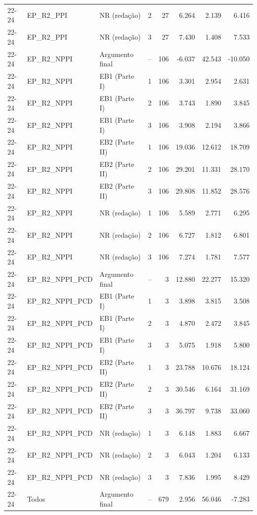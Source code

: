 \begin{longtable}{lllcrrrr}
22-24 & EP\_R2\_PPI & NR (redação) & 2 & 27 & 6.264 & 2.139 & 6.416 \\
22-24 & EP\_R2\_PPI & NR (redação) & 3 & 27 & 7.430 & 1.408 & 7.533 \\
22-24 & EP\_R2\_NPPI & Argumento final & -- & 106 & -6.037 & 42.543 & -10.050 \\
22-24 & EP\_R2\_NPPI & EB1 (Parte I) & 1 & 106 & 3.301 & 2.954 & 2.631 \\
22-24 & EP\_R2\_NPPI & EB1 (Parte I) & 2 & 106 & 3.743 & 1.890 & 3.845 \\
22-24 & EP\_R2\_NPPI & EB1 (Parte I) & 3 & 106 & 3.908 & 2.194 & 3.866 \\
22-24 & EP\_R2\_NPPI & EB2 (Parte II) & 1 & 106 & 19.036 & 12.612 & 18.709 \\
22-24 & EP\_R2\_NPPI & EB2 (Parte II) & 2 & 106 & 29.201 & 11.331 & 28.170 \\
22-24 & EP\_R2\_NPPI & EB2 (Parte II) & 3 & 106 & 29.808 & 11.852 & 28.576 \\
22-24 & EP\_R2\_NPPI & NR (redação) & 1 & 106 & 5.589 & 2.771 & 6.295 \\
22-24 & EP\_R2\_NPPI & NR (redação) & 2 & 106 & 6.727 & 1.812 & 6.801 \\
22-24 & EP\_R2\_NPPI & NR (redação) & 3 & 106 & 7.274 & 1.781 & 7.577 \\
22-24 & EP\_R2\_NPPI\_PCD & Argumento final & -- & 3 & 12.880 & 22.277 & 15.320 \\
22-24 & EP\_R2\_NPPI\_PCD & EB1 (Parte I) & 1 & 3 & 3.898 & 3.815 & 3.508 \\
22-24 & EP\_R2\_NPPI\_PCD & EB1 (Parte I) & 2 & 3 & 4.870 & 2.472 & 3.845 \\
22-24 & EP\_R2\_NPPI\_PCD & EB1 (Parte I) & 3 & 3 & 5.075 & 1.918 & 5.800 \\
22-24 & EP\_R2\_NPPI\_PCD & EB2 (Parte II) & 1 & 3 & 23.788 & 10.676 & 18.124 \\
22-24 & EP\_R2\_NPPI\_PCD & EB2 (Parte II) & 2 & 3 & 30.546 & 6.164 & 31.169 \\
22-24 & EP\_R2\_NPPI\_PCD & EB2 (Parte II) & 3 & 3 & 36.797 & 9.738 & 33.060 \\
22-24 & EP\_R2\_NPPI\_PCD & NR (redação) & 1 & 3 & 6.148 & 1.883 & 6.667 \\
22-24 & EP\_R2\_NPPI\_PCD & NR (redação) & 2 & 3 & 6.043 & 1.204 & 6.133 \\
22-24 & EP\_R2\_NPPI\_PCD & NR (redação) & 3 & 3 & 7.836 & 1.995 & 8.429 \\
22-24 & Todos & Argumento final & -- & 679 & 2.956 & 56.046 & -7.283 \\

\end{longtable}
